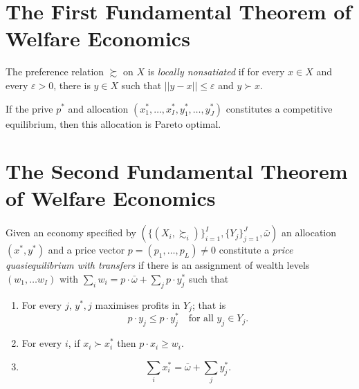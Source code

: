 \section{The First Fundamental Theorem of Welfare Economics}

\begin{defn}
    The preference relation $\succsim$ on $X$ is \emph{locally nonsatiated} if for every $x \in X$ and every $\varepsilon > 0$, there is $y \in X$ such that $||y - x || \leq \varepsilon$ and $y \succ x$.
\end{defn}

\begin{prop}
    If the prive $p^*$ and allocation $(x^*_1, \dots, x^*_I, y^*_1, \dots, y^*_J)$ constitutes a competitive equilibrium, then this allocation is Pareto optimal.
\end{prop}


\section{The Second Fundamental Theorem of Welfare Economics}

\begin{defn}
    Given an economy specified by $\left(\{(X_i, \succsim_i)\}_{i = 1}^I, \{Y_j\}_{j = 1}^J, \bar{\omega}\right)$ an allocation $(x^*, y^*)$ and a price vector $p = (p_1, \dots, p_L) \neq 0$ constitute a \emph{price quasiequilibrium with transfers} if there is an assignment of wealth levels $(w_1, \dots w_I)$ with $\sum_i w_i = p \cdot \bar{\omega} + \sum_j p \cdot y^*_j$ such that
    \begin{enumerate}
        \item 
        For every $j$, $y^*, j$ maximises profits in $Y_j$; that is
        \begin{equation*}
            p \cdot y_j \leq p \cdot y^*_j \quad \text{for all } y_j \in Y_j.
        \end{equation*}

        \item 
        For every $i$, if $x_i \succ x^*_i$ then $p \cdot x_i \geq w_i$.

        \item 
        \begin{equation*}
            \sum_i x^*_i = \bar{\omega} + \sum_j y^*_j.
        \end{equation*}
    \end{enumerate}
\end{defn}

